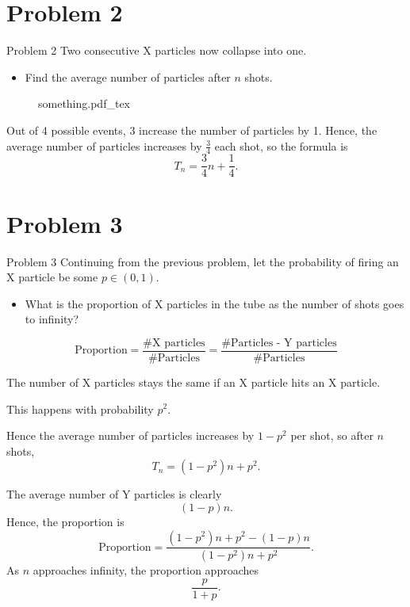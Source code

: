 \documentclass[xcolor={usenames,dvipsnames}]{beamer}
\newcommand{\incfig}[1]{%
  \def\svgwidth{0.3\textwidth}
  {#1.pdf_tex}
}
\begin{document}
\section{Problem 2}
\begin{frame}{Problem 2}
  Two consecutive X particles now collapse into one. 
  \begin{itemize}
    \item Find the average number of particles after $n$ shots.
  \end{itemize}
  \begin{multicols}{2}
  \begin{figure}[ht]
    \centering
    \incfig{something}
    \caption{}
    \label{fig:stuff}
  \end{figure}
  \columnbreak
  Out of 4 possible events, 3 increase the number of particles by 1. Hence, the average number of particles increases by $\frac{3}{4}$ each shot, so the formula is \[
    T_n = \frac{3}{4}n + \frac{1}{4}
  .\] 
  \end{multicols}
\end{frame}

\section{Problem 3}
\begin{frame}{Problem 3}
  Continuing from the previous problem, let the probability of firing an X particle be some  $p \in (0, 1)$.
  \begin{itemize}
    \item What is the proportion of X particles in the tube as the number of shots goes to infinity?
  \end{itemize}
  \vspace{1cm}
  \begin{equation*}
    \text{Proportion} = \frac{\#\text{X particles}}{\#\text{Particles}} = \frac{\#\text{Particles - Y particles}}{\#\text{Particles}}
  \end{equation*}
\end{frame}

\begin{frame}
  The number of X particles stays the same if an X particle hits an X particle.

  This happens with probability $p^2$.

  Hence the average number of particles increases by $1-p^2$ per shot, so after $n$ shots,  \[
    T_n = (1-p^2)n + p^2
  .\] 
\end{frame}
\begin{frame}
  The average number of Y particles is clearly \[
    (1-p)n
  .\] Hence, the proportion is 
  \begin{equation*}
    \text{Proportion} = \frac{(1-p^2)n + p^2 - (1-p)n}{(1-p^2)n + p^2}.
\end{equation*}
As $n$ approaches infinity, the proportion approaches \[
  \frac{p}{1+p}
.\] 
\end{frame}
\end{document}

